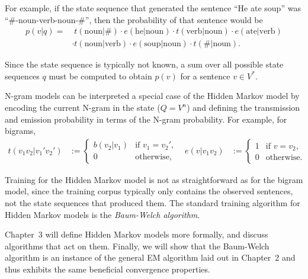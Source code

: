For example, if the state sequence that generated the sentence ``He ate soup''
was ``\#-noun-verb-noun-\#'', then the probability of that sentence would be
\begin{align*}
 p(v|q)
  =&\; t(\text{noun}|\#) \cdot e(\text{he}|\text{noun}) \cdot t(\text{verb}|\text{noun}) \cdot e(\text{ate}|\text{verb}) \\
  &\cdot t(\text{noun}|\text{verb}) \cdot e(\text{soup}|\text{noun}) \cdot t(\#|\text{noun}).
\end{align*}

Since the state sequence is typically not known, a sum over all possible state
sequences $q$ must be computed to obtain $p(v)$ for a sentence $v\in V^*$.

N-gram models can be interpreted a special case of the Hidden Markov model by
encoding the current N-gram in the state ($Q = V^n$) and defining the
transmission and emission probability in terms of the N-gram probability. For
example, for bigrams,
\begin{align*}
 t(v_1v_2|v_1'v_2') &:= \begin{cases}
  b(v_2|v_1) & \text{if } v_1 = v_2', \\
  0 &\text{otherwise},
 \end{cases} &
 e(v|v_1v_2) &:= \begin{cases}
  1 & \text{if } v = v_2, \\
  0 &\text{otherwise}.
 \end{cases}
\end{align*}

Training for the Hidden Markov model is not as straightforward as for the
bigram model, since the training corpus typically only contains the observed
sentences, not the state sequences that produced them. The standard training
algorithm for Hidden Markov models is the \emph{Baum-Welch algorithm}.
\cite{baupetsouwei70,baum1972}

Chapter~3 will define Hidden Markov models more formally, and discuss
algorithms that act on them. Finally, we will show that the Baum-Welch
algorithm is an instance of the general EM algorithm laid out in Chapter~2 and
thus exhibits the same beneficial convergence properties.
